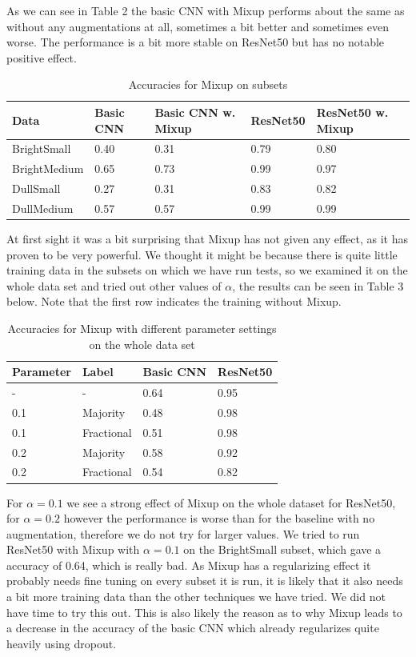 \documentclass{article}
\begin{document}
As we can see in Table 2 the basic CNN with Mixup performs about the same as without any augmentations at all, sometimes a bit better and sometimes even worse. The performance is a bit more stable on ResNet50 but has no notable positive effect.

\begin{table}[H]
	\caption{Accuracies for Mixup on subsets}
	\label{sample-table}
	\centering
	\begin{tabular}{lllll}
		\toprule
		Data &  Basic CNN & Basic CNN w. Mixup & ResNet50 & ResNet50 w. Mixup \\
		\midrule
		BrightSmall  & 0.40 & 0.31 & 0.79 &  0.80 \\
		BrightMedium & 0.65 & 0.73 & 0.99 &  0.97 \\
		DullSmall    & 0.27 & 0.31 & 0.83 &  0.82 \\
		DullMedium   & 0.57 & 0.57 & 0.99 &  0.99 \\
		\bottomrule
	\end{tabular}
\end{table}

At first sight it was a bit surprising that Mixup has not given any effect, as it has proven to be very powerful. We thought it might be because there is quite little training data in the subsets on which we have run tests, so we examined it on the whole data set and tried out other values of $\alpha$, the results can be seen in Table 3 below. Note that the first row indicates the training without Mixup. 

\begin{table}[H]
	\caption{Accuracies for Mixup with different parameter settings on the whole data set}
	\label{sample-table}
	\centering
	\begin{tabular}{llll}
		\toprule
		Parameter & Label & Basic CNN & ResNet50 \\
		\midrule
		-   & -        & 0.64   & 0.95 \\
		0.1 & Majority & 0.48       & 0.98 \\
		0.1 & Fractional & 0.51   & 0.98  \\ 
		0.2 & Majority & 0.58   & 0.92 \\
		0.2 & Fractional & 0.54 & 0.82 \\ 
		
		\bottomrule
	\end{tabular}
\end{table}

For $\alpha=0.1$ we see a strong effect of Mixup on the whole dataset for ResNet50, for $\alpha=0.2$ however the performance is worse than for the baseline with no augmentation, therefore we do not try for larger values. We tried to run ResNet50 with Mixup with $\alpha=0.1$ on the BrightSmall subset, which gave a accuracy of 0.64, which is really bad. As Mixup has a regularizing effect it probably needs fine tuning on every subset it is run, it is likely that it also needs a bit more training data than the other techniques we have tried. We did not have time to try this out. This is also likely the reason as to why Mixup leads to a decrease in the accuracy of the basic CNN which already regularizes quite heavily using dropout.
\end{document}
